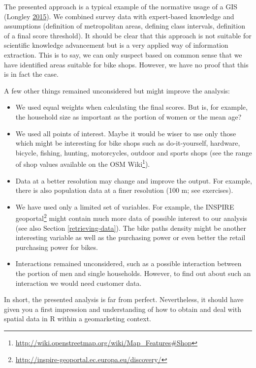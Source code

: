 \documentclass[]{krantz}
\providecommand{\tightlist}{%
  \setlength{\itemsep}{0pt}\setlength{\parskip}{0pt}}
\let\rmarkdownfootnote\footnote%
\def\footnote{\protect\rmarkdownfootnote}
\renewcommand{\href}[2]{#2\footnote{\url{#1}}}
\begin{document}
The presented approach is a typical example of the normative usage of a GIS (Longley \protect\hyperlink{ref-longley_geographic_2015}{2015}).
We combined survey data with expert-based knowledge and assumptions (definition of metropolitan areas, defining class intervals, definition of a final score threshold).
It should be clear that this approach is not suitable for scientific knowledge advancement but is a very applied way of information extraction.
This is to say, we can only suspect based on common sense that we have identified areas suitable for bike shops.
However, we have no proof that this is in fact the case.

A few other things remained unconsidered but might improve the analysis:

\begin{itemize}
\tightlist
\item
  We used equal weights when calculating the final scores.
  But is, for example, the household size as important as the portion of women or the mean age?
\item
  We used all points of interest.
  Maybe it would be wiser to use only those which might be interesting for bike shops such as do-it-yourself, hardware, bicycle, fishing, hunting, motorcycles, outdoor and sports shops (see the range of shop values available on the \href{http://wiki.openstreetmap.org/wiki/Map_Features\#Shop}{OSM Wiki}).
\item
  Data at a better resolution may change and improve the output. For example, there is also population data at a finer resolution (100 m; see exercises).
\item
  We have used only a limited set of variables.
  For example, the \href{http://inspire-geoportal.ec.europa.eu/discovery/}{INSPIRE geoportal} might contain much more data of possible interest to our analysis (see also Section \ref{retrieving-data}).
  The bike paths density might be another interesting variable as well as the purchasing power or even better the retail purchasing power for bikes.
\item
  Interactions remained unconsidered, such as a possible interaction between the portion of men and single households.
  However, to find out about such an interaction we would need customer data.
\end{itemize}

In short, the presented analysis is far from perfect.
Nevertheless, it should have given you a first impression and understanding of how to obtain and deal with spatial data in R within a geomarketing context.
\end{document}
